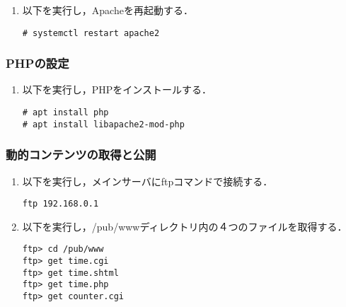 \documentclass[a4j,titlepage]{jarticle}
\begin{document}
\begin{itemize}
\begin{enumerate}
\item 以下を実行し，Apacheを再起動する．
\begin{screen}
\begin{center}
\begin{verbatim}
# systemctl restart apache2
\end{verbatim}
\end{center}
\end{screen}

\end{enumerate}

\subsubsection{PHPの設定}
\begin{enumerate}
\item 以下を実行し，PHPをインストールする．
\begin{screen}
\begin{center}
\begin{verbatim}
# apt install php
# apt install libapache2-mod-php
\end{verbatim}
\end{center}
\end{screen}
\end{enumerate}

\subsubsection{動的コンテンツの取得と公開}
\begin{enumerate}

\item 以下を実行し，メインサーバにftpコマンドで接続する．
\begin{screen}
\begin{center}
\begin{verbatim}
ftp 192.168.0.1
\end{verbatim}
\end{center}
\end{screen}

\item 以下を実行し，/pub/wwwディレクトリ内の４つのファイルを取得する．
\begin{screen}
\begin{center}
\begin{verbatim}
ftp> cd /pub/www
ftp> get time.cgi
ftp> get time.shtml
ftp> get time.php
ftp> get counter.cgi
\end{verbatim}
\end{center}
\end{screen}


\end{enumerate}
\end{itemize}
\end{document}
